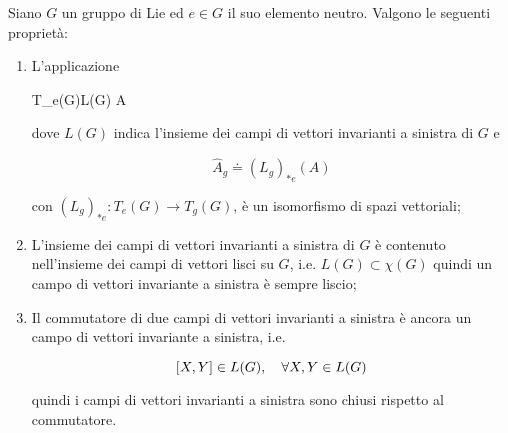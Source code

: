\begin{theorem}
	Siano $ G $ un gruppo di Lie ed $ e \in G $ il suo elemento neutro. Valgono le seguenti proprietà:
	
	\begin{enumerate}
		\item L'applicazione
		
		\map{\hatapp}
			{T_{e}(G)}{L(G)}
			{A}{}
			
		dove $ L(G) $ indica l'insieme dei campi di vettori invarianti a sinistra di $ G $ e
		
		\begin{equation}
			\hat{A}_{g} \doteq (L_{g})_{*e}(A)
		\end{equation}
	
		con $ (L_{g})_{*e} : T_{e}(G) \to T_{g}(G) $, è un isomorfismo di spazi vettoriali;
		
		\item L'insieme dei campi di vettori invarianti a sinistra di $ G $ è contenuto nell'insieme dei campi di vettori lisci su $ G $, i.e. $ L(G) \subset \chi(G) $ quindi un campo di vettori invariante a sinistra è sempre liscio;
		
		\item Il commutatore di due campi di vettori invarianti a sinistra è ancora un campo di vettori invariante a sinistra, i.e.
		
		\begin{equation}
			\comm{X}{Y} \in L(G) \qcomma \forall X,Y \in L(G)
		\end{equation}
	
		quindi i campi di vettori invarianti a sinistra sono chiusi rispetto al commutatore.
	\end{enumerate}
\end{theorem}

